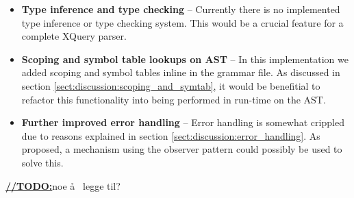 \begin{itemize}
\item \textbf{Type inference and type checking} -- Currently there is no
implemented type inference or type checking system. This would be a crucial
feature for a complete XQuery parser.

\item \textbf{Scoping and symbol table lookups on AST} -- In this implementation
we added scoping and symbol tables inline in the grammar file. As discussed in
section \ref{sect:discussion:scoping_and_symtab}, it would be benefitial to
refactor this functionality into being performed in run-time on the AST.

\item \textbf{Further improved error handling} -- Error handling is somewhat
crippled due to reasons explained in section
\ref{sect:discussion:error_handling}. As proposed, a mechanism using the
observer pattern could possibly be used to solve this.

\end{itemize}
\underline{\textbf{\LARGE //TODO:}}noe \aa~ legge til?




